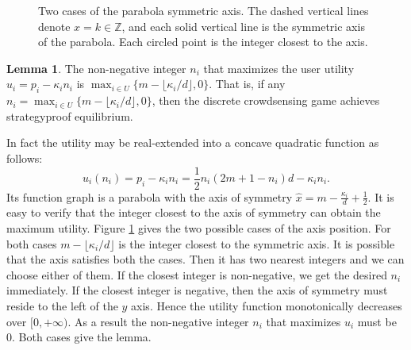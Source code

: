 \documentclass[conference]{IEEEtran}
\theoremstyle{definition}
\newtheorem{lemma}{Lemma}
\begin{document}
{\begin{figure}[!t]
\caption{\color{black}Two cases of the parabola symmetric axis. The dashed vertical lines denote $x=k\in\mathbb{Z}$, and each solid vertical line is the symmetric axis of the parabola. Each circled point is the integer closest to the axis.}
\label{fig:quad_prop}
\end{figure}

\begin{lemma}
\label{lem:quadratic}
The non-negative integer $n_i$ that maximizes the user utility $u_i = p_i - \kappa_in_i$ is $\max_{i\in U} \{m-\lfloor \kappa_i/d \rfloor, 0\}$.
{\color{blue} That is, if any $n_i = \max_{i\in U} \{m-\lfloor \kappa_i/d \rfloor, 0\}$, then the discrete crowdsensing game achieves strategyproof equilibrium. }
\end{lemma}
\begin{IEEEproof}
In fact the utility may be real-extended into a concave quadratic function as follows:
\[ u_i(n_i) = p_i - \kappa_in_i = \frac{1}{2}n_i(2m+1-n_i)d - \kappa_in_i. \]
Its function graph is a parabola with the axis of symmetry $\hat{x}=m-\frac{\kappa_i}{d}+\frac{1}{2}$. It is easy to verify that the integer closest to the axis of symmetry can obtain the maximum utility. Figure \ref{fig:quad_prop} gives the two possible cases of the axis position. For both cases $m-\lfloor \kappa_i/d \rfloor$ is the integer closest to the symmetric axis. It is possible that the axis satisfies both the cases. Then it has two nearest integers and we can choose either of them. If the closest integer is non-negative, we get the desired $n_i$ immediately. If the closest integer is negative, then the axis of symmetry must reside to the left of the $y$ axis. Hence the utility function monotonically decreases over $[0,+\infty)$. As a result the non-negative integer $n_i$ that maximizes $u_i$ must be 0. Both cases give the lemma.
\end{IEEEproof}

}
\end{document}
